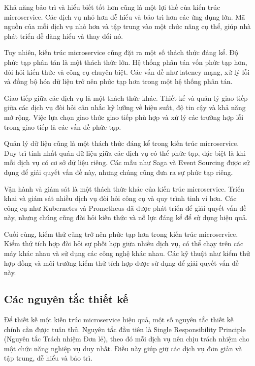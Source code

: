 Khả năng bảo trì và hiểu biết tốt hơn cũng là một lợi thế của kiến trúc
microservice. Các dịch vụ nhỏ hơn dễ hiểu và bảo trì hơn các ứng dụng lớn. Mã
nguồn của mỗi dịch vụ nhỏ hơn và tập trung vào một chức năng cụ thể, giúp nhà
phát triển dễ dàng hiểu và thay đổi nó.

Tuy nhiên, kiến trúc microservice cũng đặt ra một số thách thức đáng kể. Độ
phức tạp phân tán là một thách thức lớn. Hệ thống phân tán vốn phức tạp hơn,
đòi hỏi kiến thức và công cụ chuyên biệt. Các vấn đề như latency mạng, xử lý
lỗi và đồng bộ hóa dữ liệu trở nên phức tạp hơn trong một hệ thống phân tán.

Giao tiếp giữa các dịch vụ là một thách thức khác. Thiết kế và quản lý giao
tiếp giữa các dịch vụ đòi hỏi cân nhắc kỹ lưỡng về hiệu suất, độ tin cậy và khả
năng mở rộng. Việc lựa chọn giao thức giao tiếp phù hợp và xử lý các trường hợp
lỗi trong giao tiếp là các vấn đề phức tạp.

Quản lý dữ liệu cũng là một thách thức đáng kể trong kiến trúc microservice.
Duy trì tính nhất quán dữ liệu giữa các dịch vụ có thể phức tạp, đặc biệt là
khi mỗi dịch vụ có cơ sở dữ liệu riêng. Các mẫu như Saga và Event Sourcing được
sử dụng để giải quyết vấn đề này, nhưng chúng cũng đưa ra sự phức tạp riêng.

Vận hành và giám sát là một thách thức khác của kiến trúc microservice. Triển
khai và giám sát nhiều dịch vụ đòi hỏi công cụ và quy trình tinh vi hơn. Các
công cụ như Kubernetes và Prometheus đã được phát triển để giải quyết vấn đề
này, nhưng chúng cũng đòi hỏi kiến thức và nỗ lực đáng kể để sử dụng hiệu quả.

Cuối cùng, kiểm thử cũng trở nên phức tạp hơn trong kiến trúc microservice.
Kiểm thử tích hợp đòi hỏi sự phối hợp giữa nhiều dịch vụ, có thể chạy trên các
máy khác nhau và sử dụng các công nghệ khác nhau. Các kỹ thuật như kiểm thử hợp
đồng và môi trường kiểm thử tích hợp được sử dụng để giải quyết vấn đề này.

\subsection{Các nguyên tắc thiết kế}
Để thiết kế một kiến trúc microservice hiệu quả, một số nguyên tắc thiết kế chính cần được tuân thủ. Nguyên tắc đầu tiên là Single Responsibility Principle (Nguyên tắc Trách nhiệm Đơn lẻ), theo đó mỗi dịch vụ nên chịu trách nhiệm cho một chức năng nghiệp vụ duy nhất. Điều này giúp giữ các dịch vụ đơn giản và tập trung, dễ hiểu và bảo trì.

